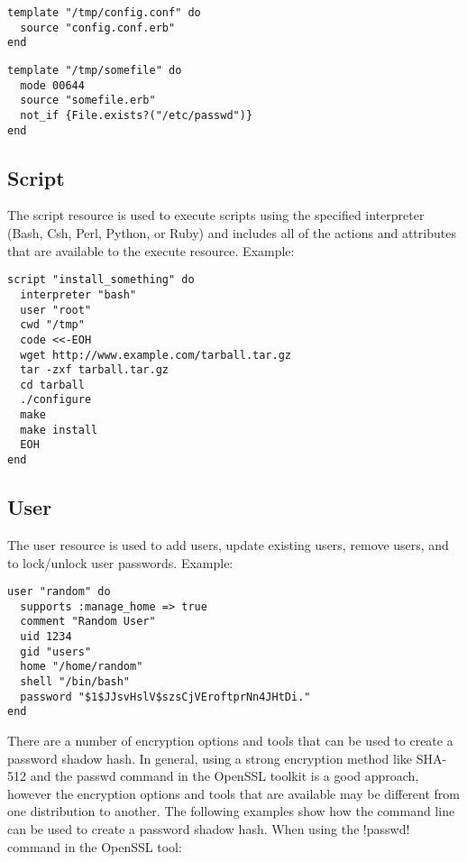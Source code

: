 \begin{lstlisting}[label=lst:cookbook-resources-cookbook-template1]
template "/tmp/config.conf" do
  source "config.conf.erb"
end
\end{lstlisting}

\begin{lstlisting}[label=lst:cookbook-resources-cookbook-template2]
template "/tmp/somefile" do
  mode 00644
  source "somefile.erb"
  not_if {File.exists?("/etc/passwd")}
end
\end{lstlisting}

\subsection{Script}

The script resource is used to execute scripts using the specified interpreter (Bash, Csh, Perl, Python, or Ruby) and includes all of the actions and attributes that are available to the execute resource. Example:

\begin{lstlisting}[label=lst:cookbook-resources-cookbook-script1]
script "install_something" do
  interpreter "bash"
  user "root"
  cwd "/tmp"
  code <<-EOH
  wget http://www.example.com/tarball.tar.gz
  tar -zxf tarball.tar.gz
  cd tarball
  ./configure
  make
  make install
  EOH
end
\end{lstlisting}

\subsection{User}

The user resource is used to add users, update existing users, remove users, and to lock/unlock user passwords. Example:

\begin{lstlisting}[label=lst:cookbook-resources-cookbook-user1]
user "random" do
  supports :manage_home => true
  comment "Random User"
  uid 1234
  gid "users"
  home "/home/random"
  shell "/bin/bash"
  password "$1$JJsvHslV$szsCjVEroftprNn4JHtDi."
end
\end{lstlisting}

There are a number of encryption options and tools that can be used to create a password shadow hash. In general, using a strong encryption method like SHA-512 and the passwd command in the OpenSSL toolkit is a good approach, however the encryption options and tools that are available may be different from one distribution to another. The following examples show how the command line can be used to create a password shadow hash. When using the \inline!passwd! command in the OpenSSL tool:


